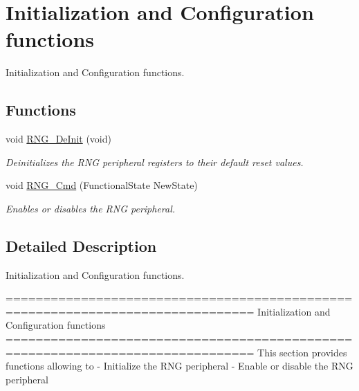 \hypertarget{group___r_n_g___group1}{\section{Initialization and Configuration functions}
\label{group___r_n_g___group1}
}


Initialization and Configuration functions.  


\subsection*{Functions}
\begin{DoxyCompactItemize}
\item 
void \hyperlink{group___r_n_g___group1_ga15ff5e649080076eebd51143b9ac4491}{R\-N\-G\-\_\-\-De\-Init} (void)
\begin{DoxyCompactList}\small\item\em Deinitializes the R\-N\-G peripheral registers to their default reset values. \end{DoxyCompactList}\item 
void \hyperlink{group___r_n_g___group1_ga6c1a8372da6e8a06819903c63faecd7b}{R\-N\-G\-\_\-\-Cmd} (Functional\-State New\-State)
\begin{DoxyCompactList}\small\item\em Enables or disables the R\-N\-G peripheral. \end{DoxyCompactList}\end{DoxyCompactItemize}


\subsection{Detailed Description}
Initialization and Configuration functions. \begin{DoxyVerb} ===============================================================================
                      Initialization and Configuration functions
 ===============================================================================  
  This section provides functions allowing to 
   - Initialize the RNG peripheral
   - Enable or disable the RNG peripheral\end{DoxyVerb}
 

